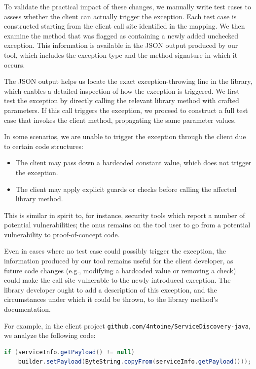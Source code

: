 To validate the practical impact of these changes, we manually write test cases to assess whether the client can actually trigger the exception. Each test case is constructed starting from the client call site identified in the mapping. We then examine the method that was flagged as containing a newly added unchecked exception. This information is available in the JSON output produced by our tool, which includes the exception type and the method signature in which it occurs.

The JSON output helps us locate the exact exception-throwing line in the library, which enables a detailed inspection of how the exception is triggered. We first test the exception by directly calling the relevant library method with crafted parameters. If this call triggers the exception, we proceed to construct a full test case that invokes the client method, propagating the same parameter values.

In some scenarios, we are unable to trigger the exception through the client due to certain code structures:
\begin{itemize}
  \item The client may pass down a hardcoded constant value, which does not trigger the exception.
  \item The client may apply explicit guards or checks before calling the affected library method.
\end{itemize}

This is similar in spirit to, for instance, security tools which report a number of potential vulnerabilities; the onus remains on the tool user to go from a potential vulnerability to proof-of-concept code.

Even in cases where no test case could possibly trigger the exception, the information produced by our tool remains useful for the client developer, as future code changes (e.g., modifying a hardcoded value or removing a check) could make the call site vulnerable to the newly introduced exception. The library developer ought to add a description of this exception, and the circumstances under which it could be thrown, to the library method's documentation.

For example, in the client project \texttt{github.com/4ntoine/ServiceDiscovery-java}, we analyze the following code:

\begin{lstlisting}[language=Java, basicstyle=\scriptsize\ttfamily, breaklines=true]
if (serviceInfo.getPayload() != null)
    builder.setPayload(ByteString.copyFrom(serviceInfo.getPayload()));
\end{lstlisting}

